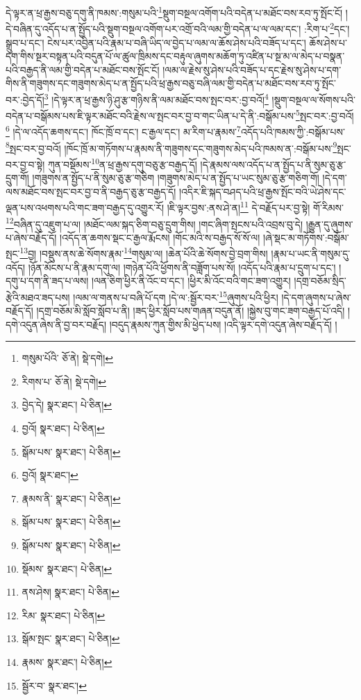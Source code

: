 དེ་ལྟར་ན་ཕྲ་རྒྱས་བཅུ་དགུ་ནི་ཁམས་:གསུམ་པའི་\footnote{གསུམ་པོའི་  ཅོ་ནེ།  སྡེ་དགེ། }སྡུག་བསྔལ་འགོག་པའི་བདེན་པ་མཐོང་བས་རབ་ཏུ་སྤོང་ངོ། །དེ་བཞིན་དུ་འདོད་པ་ན་སྤྱོད་པའི་སྡུག་བསྔལ་འགོག་པར་འགྲོ་བའི་ལམ་གྱི་བདེན་པ་ལ་ལམ་དང་། :རིག་པ་\footnote{རིགས་པ་  ཅོ་ནེ།  སྡེ་དགེ། }དང་། སྒྲུབ་པ་དང་། ངེས་པར་འབྱིན་པའི་རྣམ་པ་བཞི་ཡིད་ལ་བྱེད་པ་ལམ་ལ་ཆོས་ཤེས་པའི་བཟོད་པ་དང་། ཆོས་ཤེས་པ་དག་གིས་སྔར་བསྟན་པའི་བདུན་པོ་ལ་ཚུལ་ཁྲིམས་དང་བརྟུལ་ཞུགས་མཆོག་ཏུ་འཛིན་པ་སྔ་མ་ལ་མེད་པ་བསྣན་པའི་བརྒྱད་ནི་ལམ་གྱི་བདེན་པ་མཐོང་བས་སྤོང་ངོ། །ལམ་ལ་རྗེས་སུ་ཤེས་པའི་བཟོད་པ་དང་རྗེས་སུ་ཤེས་པ་དག་གིས་ནི་གཟུགས་དང་གཟུགས་མེད་པ་ན་སྤྱོད་པའི་ཕྲ་རྒྱས་བཅུ་བཞི་ལམ་གྱི་བདེན་པ་མཐོང་བས་རབ་ཏུ་སྤོང་བར་:བྱེད་དོ།\footnote{བྱེད་དེ།  སྣར་ཐང་།  པེ་ཅིན། } །དེ་ལྟར་ན་ཕྲ་རྒྱས་ཉི་ཤུ་རྩ་གཉིས་ནི་ལམ་མཐོང་བས་སྤང་བར་:བྱ་བའོ།\footnote{བྱའོ།  སྣར་ཐང་།  པེ་ཅིན། } །སྡུག་བསྔལ་ལ་སོགས་པའི་བདེན་པ་བསྒོམས་པས་ཇི་ལྟར་མཐོང་བའི་རྗེས་ལ་སྤང་བར་བྱ་བ་གང་ཡིན་པ་དེ་ནི་:བསྒོམ་པས་\footnote{སྒོམ་པས་  སྣར་ཐང་།  པེ་ཅིན། }སྤང་བར་:བྱ་བའོ།\footnote{བྱའོ།  སྣར་ཐང་། } །དེ་ལ་འདོད་ཆགས་དང་། ཁོང་ཁྲོ་བ་དང་། ང་རྒྱལ་དང་། མ་རིག་པ་རྣམས་\footnote{རྣམས་ནི་  སྣར་ཐང་།  པེ་ཅིན། }འདོད་པའི་ཁམས་ཀྱི་:བསྒོམ་པས་\footnote{སྒོམ་པས་  སྣར་ཐང་།  པེ་ཅིན། }སྤང་བར་བྱ་བའོ། །ཁོང་ཁྲོ་མ་གཏོགས་པ་རྣམས་ནི་གཟུགས་དང་གཟུགས་མེད་པའི་ཁམས་ན་:བསྒོམ་པས་\footnote{སྒོམ་པས་  སྣར་ཐང་།  པེ་ཅིན། }སྤང་བར་བྱ་བ་སྟེ། ཀུན་བསྡོམས་\footnote{སྡོམས་  སྣར་ཐང་།  པེ་ཅིན། }ན་ཕྲ་རྒྱས་དགུ་བཅུ་རྩ་བརྒྱད་དོ། །དེ་རྣམས་ལས་འདོད་པ་ན་སྤྱོད་པ་ནི་སུམ་ཅུ་རྩ་དྲུག་གོ། །གཟུགས་ན་སྤྱོད་པ་ནི་སུམ་ཅུ་རྩ་གཅིག །གཟུགས་མེད་པ་ན་སྤྱོད་པ་ཡང་སུམ་ཅུ་རྩ་གཅིག་གོ། །དེ་དག་ལས་མཐོང་བས་སྤང་བར་བྱ་བ་ནི་བརྒྱད་ཅུ་རྩ་བརྒྱད་དོ། །འདིར་ཇི་སྐད་བཤད་པའི་ཕྲ་རྒྱས་སྤོང་བའི་ཡེ་ཤེས་དང་ལྡན་པས་འཕགས་པའི་གང་ཟག་བརྒྱད་དུ་འགྱུར་རོ། །ཇི་ལྟར་བྱས་:ནས་ཤེ་ན།\footnote{ནས་ཤེས།  སྣར་ཐང་།  པེ་ཅིན། } དེ་བརྗོད་པར་བྱ་སྟེ། གོ་རིམས་\footnote{རིམ་  སྣར་ཐང་།  པེ་ཅིན། }བཞིན་དུ་འཇུག་པ་ལ། །མཐོང་ལམ་སྐད་ཅིག་བཅུ་དྲུག་གིས། །གང་ཞིག་སྤངས་པའི་འབྲས་བུ་དེ། །རྒྱུན་དུ་ཞུགས་པ་ཞེས་བརྗོད་དོ། །འདོད་ན་ཆགས་སྡང་ང་རྒྱལ་རྨོངས། །གོང་མའི་ས་བརྒྱད་སོ་སོ་ལ། །ཞེ་སྡང་མ་གཏོགས་:བསྒོམ་སྤང་\footnote{སྒོམ་སྤང་  སྣར་ཐང་།  པེ་ཅིན། }བྱ། །བསྡུས་ནས་ཆེ་སོགས་རྣམ་\footnote{རྣམས་  སྣར་ཐང་།  པེ་ཅིན། }གསུམ་ལ། །ཆེན་པོའི་ཆེ་སོགས་བྱེ་བྲག་གིས། །རྣམ་པ་ཡང་ནི་གསུམ་དུ་འདོད། །ཉོན་མོངས་པ་ནི་རྣམ་དགུ་ལ། །གཉེན་པོའི་ཕྱོགས་ནི་བཟློག་པས་སོ། །འདོད་པའི་རྣམ་པ་དྲུག་པ་དང་། །དགུ་པ་དག་ནི་ཟད་པ་ལས། །ལན་ཅིག་ཕྱིར་ནི་འོང་བ་དང་། །ཕྱིར་མི་འོང་བའི་གང་ཟག་འགྱུར། །དགྲ་བཅོམ་སྲིད་རྩེའི་མཐའ་ཟད་པས། །ལམ་ལ་གནས་པ་བཞི་པོ་དག །དེ་ལ་:སྦྱོར་བར་\footnote{སྦྱོར་བ་  སྣར་ཐང་། }ཞུགས་པའི་ཕྱིར། །དེ་དག་ཞུགས་པ་ཞེས་བརྗོད་དོ། །དགྲ་བཅོམ་མི་སློབ་སློབ་པ་ནི། །ཟད་ཕྱིར་སློབ་པས་གཞན་བདུན་ནོ། །སྐྱེས་བུ་གང་ཟག་བརྒྱད་པོ་འདི། །དགེ་འདུན་ཞེས་ནི་བྱ་བར་བརྗོད། །བདུད་རྣམས་ཀུན་གྱིས་མི་ཕྱེད་པས། །འདི་ལྟར་དགེ་འདུན་ཞེས་བརྗོད་དོ། །
